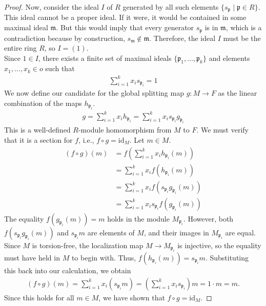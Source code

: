 \documentclass[12pt]{article}
\theoremstyle{plain}
\theoremstyle{remark}
\theoremstyle{definition}
\begin{document}
\begin{proof}
    Now, consider the ideal $I$ of $R$ generated by all such elements $\{s_\mathfrak{p} \mid \mathfrak{p} \in R\}$. This ideal cannot be a proper ideal. If it were, it would be contained in some maximal ideal $\mathfrak{m}$. But this would imply that every generator $s_\mathfrak{p}$ is in $\mathfrak{m}$, which is a contradiction because by construction, $s_\mathfrak{m} \notin \mathfrak{m}$. Therefore, the ideal $I$ must be the entire ring $R$, so $I = (1)$. \\
    Since $1 \in I$, there exists a finite set of maximal ideals $\{\mathfrak{p}_1, \dots, \mathfrak{p}_k\}$ and elements $x_1, \dots, x_k \in o$ such that
    \begin{align*}
        \sum_{i=1}^k x_i s_{\mathfrak{p}_i} = 1
    \end{align*}
    We now define our candidate for the global splitting map $g: M \to F$ as the linear combination of the maps $h_{\mathfrak{p}_i}$.
    \begin{align*}
        g = \sum_{i=1}^k x_i h_{\mathfrak{p}_i} = \sum_{i=1}^k x_i s_{\mathfrak{p}_i} g_{\mathfrak{p}_i}
    \end{align*}
    This is a well-defined $R$-module homomorphism from $M$ to $F$. We must verify that it is a section for $f$, i.e., $f \circ g = \mathrm{id}_M$. Let $m \in M$.
    \begin{align*}
    (f \circ g)(m) &= f \left( \sum_{i=1}^k x_i h_{\mathfrak{p}_i}(m) \right) \\
    &= \sum_{i=1}^k x_i f(h_{\mathfrak{p}_i}(m)) \\
    &= \sum_{i=1}^k x_i f(s_{\mathfrak{p}_i} g_{\mathfrak{p}_i}(m)) \\
    &= \sum_{i=1}^k x_i s_{\mathfrak{p}_i} f(g_{\mathfrak{p}_i}(m))
    \end{align*}
    The equality $f(g_{\mathfrak{p}_i}(m)) = m$ holds in the module $M_{\mathfrak{p}_i}$. However, both $f(s_{\mathfrak{p}_i} g_{\mathfrak{p}_i}(m))$ and $s_{\mathfrak{p}_i} m$ are elements of $M$, and their images in $M_{\mathfrak{p}_i}$ are equal. Since $M$ is torsion-free, the localization map $M \to M_{\mathfrak{p}_i}$ is injective, so the equality must have held in $M$ to begin with. Thus, $f(h_{\mathfrak{p}_i}(m)) = s_{\mathfrak{p}_i} m$. Substituting this back into our calculation, we obtain
    \begin{align*}
        (f \circ g)(m) = \sum_{i=1}^k x_i (s_{\mathfrak{p}_i} m) = \left( \sum_{i=1}^k x_i s_{\mathfrak{p}_i} \right) m = 1 \cdot m = m.
    \end{align*}
    Since this holds for all $m \in M$, we have shown that $f \circ g = \mathrm{id}_M$.
\end{proof}
\end{document}
